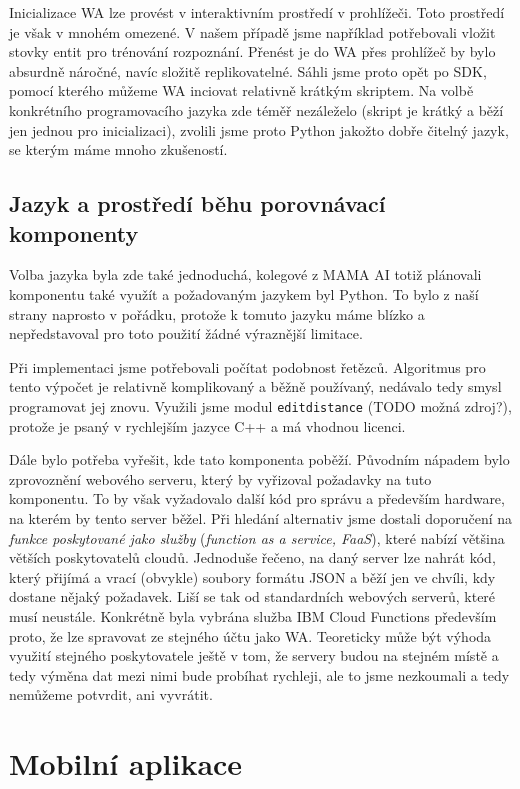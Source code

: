 Inicializace WA lze provést v interaktivním prostředí v prohlížeči. Toto
prostředí je však v mnohém omezené. V našem případě jsme například potřebovali
vložit stovky entit pro trénování rozpoznání. Přenést je do WA přes prohlížeč
by bylo absurdně náročné, navíc složitě replikovatelné. Sáhli jsme proto opět
po SDK, pomocí kterého můžeme WA inciovat relativně krátkým skriptem. Na volbě
konkrétního programovacího jazyka zde téměř nezáleželo (skript je krátký a běží
jen jednou pro inicializaci), zvolili jsme proto Python jakožto dobře čitelný
jazyk, se kterým máme mnoho zkušeností.

\subsection{Jazyk a prostředí běhu porovnávací komponenty}

Volba jazyka byla zde také jednoduchá, kolegové z MAMA AI totiž plánovali
komponentu také využít a požadovaným jazykem byl Python. To bylo z naší
strany naprosto v pořádku, protože k tomuto jazyku máme blízko a nepředstavoval
pro toto použití žádné výraznější limitace.

Při implementaci jsme potřebovali počítat podobnost řetězců. Algoritmus
pro tento výpočet je relativně komplikovaný a běžně používaný, nedávalo tedy
smysl programovat jej znovu. Využili jsme modul \texttt{editdistance} (TODO
možná zdroj?), protože je psaný v rychlejším jazyce C++ a má vhodnou licenci.

Dále bylo potřeba vyřešit, kde tato komponenta poběží. Původním nápadem bylo
zprovoznění webového serveru, který by vyřizoval požadavky na tuto komponentu.
To by však vyžadovalo další kód pro správu a především hardware, na kterém by
tento server běžel. Při hledání alternativ jsme dostali doporučení na
\textit{funkce poskytované jako služby} (\textit{function as a service, FaaS}),
které nabízí většina větších poskytovatelů cloudů. Jednoduše řečeno, na daný
server lze nahrát kód, který přijímá a vrací (obvykle) soubory formátu JSON a
běží jen ve chvíli, kdy dostane nějaký požadavek. Liší se tak od standardních
webových serverů, které musí  neustále. Konkrétně byla vybrána
služba IBM Cloud Functions především proto, že lze spravovat ze stejného účtu jako
WA. Teoreticky může být výhoda využití stejného poskytovatele ještě v tom, že
servery budou na stejném místě a tedy výměna dat mezi nimi bude probíhat rychleji,
ale to jsme nezkoumali a tedy nemůžeme potvrdit, ani vyvrátit.

\section{Mobilní aplikace}

